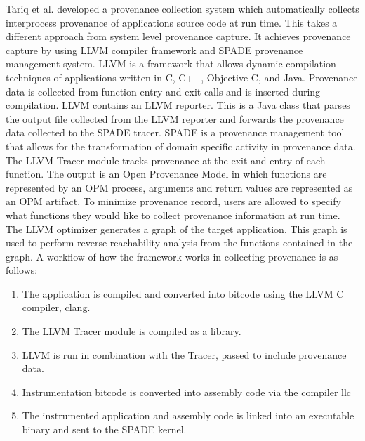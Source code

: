 Tariq et al. \cite{tariq_towards_2012} developed a provenance collection system which automatically collects interprocess provenance of applications source code at run time. This takes a different approach from system level provenance capture. It achieves provenance capture by using LLVM compiler framework and SPADE provenance management system. LLVM is a framework that allows dynamic compilation techniques of applications written in C, C++, Objective-C, and Java. Provenance data is collected from function entry and exit calls and is inserted during compilation. LLVM contains an LLVM reporter. This is a Java class that parses the output file collected from the LLVM reporter and forwards the provenance data collected to the SPADE tracer. SPADE is a provenance management tool that allows for the transformation of domain specific activity in provenance data. The LLVM Tracer module tracks provenance at the exit and entry of each function. The output is an Open Provenance Model in which functions are represented by an OPM process, arguments and return values are represented as an OPM artifact. To minimize provenance record, users are allowed to specify what functions they would like to collect provenance information at run time. The LLVM optimizer generates a graph of the target application. This graph is used to perform reverse reachability analysis  from the functions contained in the graph. A workflow of how the framework works in collecting provenance is as follows:

\begin{enumerate}


\item The application is compiled and converted into bitcode using the LLVM C compiler, clang.

\item The LLVM Tracer module is compiled as a library.

\item LLVM is run in combination with the Tracer, passed to include provenance data. 

\item Instrumentation bitcode is converted into assembly code via the compiler llc



\item  The instrumented application and assembly code is linked into an executable binary and sent to the SPADE kernel.
\end{enumerate}


